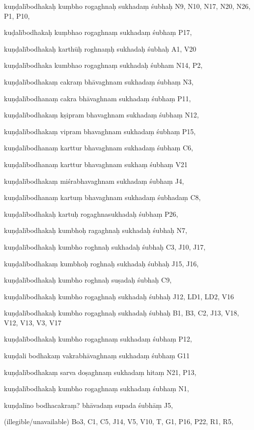 \begin{ekdosis}
\begin{marma}[hp01_055]
\begin{marma}[hp02_009]
\begin{marma}[hp02_011]
\begin{marma}[hp02_67ab]
\item[kuṇḍalībodhakaḥ kuṃbho rogaghnaḥ sukhadaṃ śubhaḥ] N9, N10, N17, N20,  N26, P1, P10, 
\item[kuḍalībodhakaḥ kuṃbhao rogaghnaṃ sukhadaṃ śubhaṃ] P17,
\item[kuṇḍalībodhakaḥ karthūḥ roghnaṃḥ sukhadaḥ śubhaḥ] A1, V20
\item[kuṇḍalībodhaka kumbhao rogaghnaṃ sukhadaḥ śubham] N14, P2,
\item[kuṇḍalībodhakaṃ cakraṃ bhāvaghnam sukhadaṃ śubhaṃ] N3,
\item[kuṇḍalībodhanaṃ cakra bhāvaghnam sukhadaṃ śubhaṃ] P11,  
\item[kuṇḍalībodhakaṃ kṣipram bhavaghnam sukhadaṃ śubhaṃ] N12,
\item[kuṇḍalībodhakaṃ vipram bhavaghnam sukhadaṃ śubhaṃ] P15,
\item[kuṇḍalībodhanaṃ karttur bhavaghnam sukhadaṃ śubhaṃ] C6,
\item[kuṇḍalībodhanaṃ karttur bhavaghnam sukhaṃ śubhaṃ] V21
\item[kuṇḍalībodhakaṃ miśrabhavaghnam sukhadaṃ śubhaṃ] J4,
\item[kuṇḍalībodhanaṃ kartuṃ bhavaghnam sukhadaṃ śubhadaṃ] C8,
\item[kuṇḍalībodhakaḥ kartuḥ rogaghnasukhadaḥ śubhaṃ] P26, 
\item[kuṇḍalībodhakaḥ kumbhoḥ ragaghnaḥ sukhadaḥ śubhaḥ] N7, 
\item[kuṇḍalībodhakaḥ kumbho roghnaḥ sukhadaḥ śubhaḥ] C3, J10, J17, 
\item[kuṇḍalībodhakaṃ kumbhoḥ roghnaḥ sukhadaḥ śubhaḥ] J15, J16,
\item[kuṇḍalībodhakaḥ kumbho roghnaḥ suṣadaḥ śubhaḥ] C9, 
\item[kuṇḍalībodhakaḥ kumbho rogaghnaḥ sukhadaḥ śubhaḥ] J12, LD1, LD2, V16 
\item[kuṇḍalībodhakaḥ kumbho rogaghnaḥ sukhadaḥ śubhaḥ] B1, B3, C2, J13, V18, V12, V13, V3, V17 
\item[kuṇḍalībodhakaḥ kumbho rogaghnaṃ sukhadaṃ śubhaṃ] P12,
\item[kuṇḍali bodhakaṃ vakrabhāvaghnaṃ sukhadaṃ śubhaṃ] G11
\item[kuṇḍalībodhakaṃ sarva doṣaghnaṃ sukhadaṃ hitaṃ] N21, P13, 
\item[kuṇḍalībodhakaḥ kumbho rogaghnaṃ sukhadaṃ śubhaṃ] N1, 
\item[kuṇḍalīno bodhacakraṃ? bhāvadaṃ supada śubhāṃ] J5,
\item[(illegible/unavailable)] Bo3, C1, C5, J14, V5, V10, T, G1, P16, P22, R1, R5,
  \begin{description}


\end{description}
\end{marma}
\end{marma}
\end{marma}
\end{marma}
\end{ekdosis}
